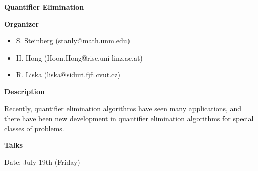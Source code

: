 \begin{center}
{\LARGE \bf Quantifier Elimination
}
\end{center}
\bigskip

\noindent
{\bf Organizer}
\medskip

\begin{itemize}

\item
S. Steinberg (stanly@math.unm.edu)
\item
H. Hong (Hoon.Hong@risc.uni-linz.ac.at)

\item
R. Liska (liska@siduri.fjfi.cvut.cz)

\end{itemize}

\bigskip

\noindent
{\bf Description}
\medskip

Recently, quantifier elimination algorithms have seen many applications, and there have been new
development in quantifier elimination algorithms for special classes of problems. 

\bigskip
\noindent
{\bf Talks}
\medskip

Date: July 19th (Friday) 

